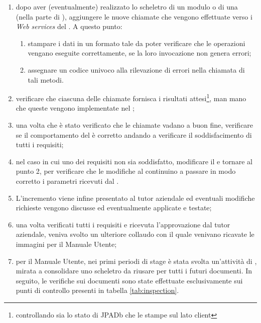 \begin{enumerate}
\item dopo aver (eventualmente) realizzato lo scheletro di un modulo o di una
   (nella parte di \FREND{}), aggiungere le nuove chiamate
   che vengono effettuate verso i \emph{Web services} del \BKEND{}.
  A questo punto:
  \begin{enumerate}
  \item stampare i dati in un formato tale da poter verificare che le
    operazioni vengano eseguite correttamente, se la loro invocazione non
    genera errori;
  \item assegnare un codice univoco alla rilevazione di errori nella chiamata
    di tali metodi.
  \end{enumerate}
\item verificare che ciascuna delle chiamate  fornisca i risultati
  attesi\footnote{controllando sia lo stato di JPADb che le stampe sul lato
  client}, man mano che queste vengono implementate nel \BKEND{};
\item una volta che è stato verificato che le chiamate  vadano a
  buon fine, verificare se il comportamento del \FREND{} è corretto andando a
  verificare il soddisfacimento di tutti i requisiti;
\item nel caso in cui uno dei requisiti non sia soddisfatto, modificare il
  \FREND{} e tornare al punto 2, per verificare che le modifiche al \FREND{}
  continuino a passare in modo corretto i parametri ricevuti dal \BKEND{}.
\item L'incremento viene infine presentato al tutor aziendale ed eventuali
  modifiche richieste vengono discusse ed eventualmente applicate e testate;
\item una volta verificati tutti i requisiti e ricevuta l'approvazione dal
  tutor aziendale, veniva svolto un ulteriore collaudo con il quale venivano
  ricavate le immagini per il Manuale Utente;
\item per il Manuale Utente, nei primi periodi di stage è stata svolta
  un'attività di , mirata a consolidare uno scheletro da
  riusare per tutti i futuri documenti. In seguito, le verifiche sui documenti
  sono state effettuate esclusivamente sui punti di controllo presenti in
  tabella \ref{tab:inspection}. \\
\end{enumerate}

